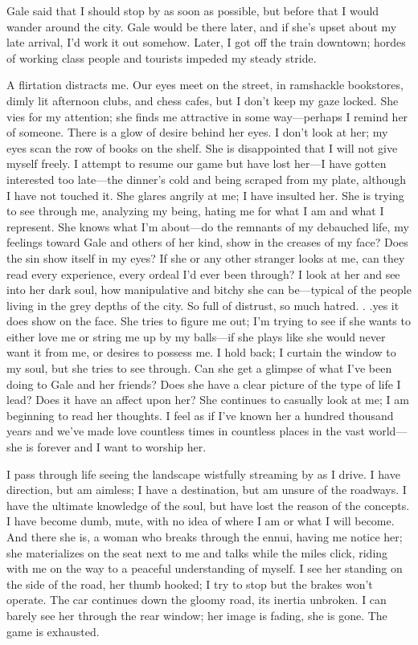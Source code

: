 Gale said that I should stop by as soon as possible, but before that I
would wander around the city. Gale would be there later, and if she's
upset about my late arrival, I'd work it out somehow. Later, I got off
the train downtown; hordes of working class people and tourists impeded
my steady stride.

A flirtation distracts me. Our eyes meet on the street, in ramshackle
bookstores, dimly lit afternoon clubs, and chess cafes, but I don't keep
my gaze locked. She vies for my attention; she finds me attractive in
some way---perhaps I remind her of someone. There is a glow of desire
behind her eyes. I don't look at her; my eyes scan the row of books on
the shelf. She is disappointed that I will not give myself freely. I
attempt to resume our game but have lost her---I have gotten interested
too late---the dinner's cold and being scraped from my plate, although I
have not touched it. She glares angrily at me; I have insulted her. She
is trying to see through me, analyzing my being, hating me for what I am
and what I represent. She knows what I'm about---do the remnants of my
debauched life, my feelings toward Gale and others of her kind, show in
the creases of my face? Does the sin show itself in my eyes? If she or
any other stranger looks at me, can they read every experience, every
ordeal I'd ever been through? I look at her and see into her dark soul,
how manipulative and bitchy she can be---typical of the people living in
the grey depths of the city. So full of distrust, so much hatred. . .yes
it does show on the face. She tries to figure me out; I'm trying to see
if she wants to either love me or string me up by my balls---if she
plays like she would never want it from me, or desires to possess me. I
hold back; I curtain the window to my soul, but she tries to see
through. Can she get a glimpse of what I've been doing to Gale and her
friends? Does she have a clear picture of the type of life I lead? Does
it have an affect upon her? She continues to casually look at me; I am
beginning to read her thoughts. I feel as if I've known her a hundred
thousand years and we've made love countless times in countless places
in the vast world---she is forever and I want to worship her.

I pass through life seeing the landscape wistfully streaming by as I
drive. I have direction, but am aimless; I have a destination, but am
unsure of the roadways. I have the ultimate knowledge of the soul, but
have lost the reason of the concepts. I have become dumb, mute, with no
idea of where I am or what I will become. And there she is, a woman who
breaks through the ennui, having me notice her; she materializes on the
seat next to me and talks while the miles click, riding with me on the
way to a peaceful understanding of myself. I see her standing on the
side of the road, her thumb hooked; I try to stop but the brakes won't
operate. The car continues down the gloomy road, its inertia unbroken. I
can barely see her through the rear window; her image is fading, she is
gone. The game is exhausted.

